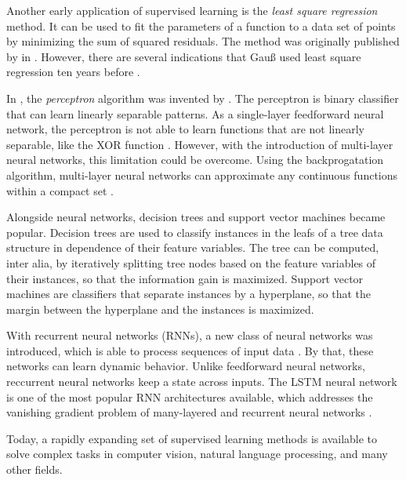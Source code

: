 Another early application of supervised learning is the \textit{least square regression} method.
It can be used to fit the parameters of a function to a data set of points by minimizing the sum of squared residuals.
The method was originally published by \citeauthor{legendre1805nouvelles} in \citeyear{legendre1805nouvelles} \cite{legendre1805nouvelles}.
However, there are several indications that Gauß used least square regression ten years before \citeauthor{legendre1805nouvelles} \cite{stigler1981gauss}.

In \citeyear{rosenblatt1957perceptron}, the \textit{perceptron} algorithm was invented by \citeauthor{rosenblatt1957perceptron} \cite{rosenblatt1957perceptron}.
The perceptron is binary classifier that can learn linearly separable patterns.
As a single-layer feedforward neural network, the perceptron is not able to learn functions that are not linearly separable, like the XOR function \cite{minsky2017perceptrons}.
However, with the introduction of multi-layer neural networks, this limitation could be overcome.
Using the backprogatation algorithm, multi-layer neural networks can approximate any continuous functions within a compact set \cite{DBLP:journals/mcss/Cybenko89}.

Alongside neural networks, decision trees \cite{DBLP:journals/ml/Quinlan86} and support vector machines \cite{DBLP:journals/ml/CortesV95} became popular.
Decision trees are used to classify instances in the leafs of a tree data structure in dependence of their feature variables.
The tree can be computed, inter alia, by iteratively splitting tree nodes based on the feature variables of their instances, so that the information gain is maximized.
Support vector machines are classifiers that separate instances by a hyperplane, so that the margin between the hyperplane and the instances is maximized.

With recurrent neural networks (RNNs), a new class of neural networks was introduced, which is able to process sequences of input data \cite{rumelhart1986learning}.
By that, these networks can learn dynamic behavior.
Unlike feedforward neural networks, reccurrent neural networks keep a state across inputs.
The LSTM neural network is one of the most popular RNN architectures available, which addresses the vanishing gradient problem of many-layered and recurrent neural networks \cite{DBLP:journals/neco/HochreiterS97}.

Today, a rapidly expanding set of supervised learning methods is available to solve complex tasks in computer vision, natural language processing, and many other fields.